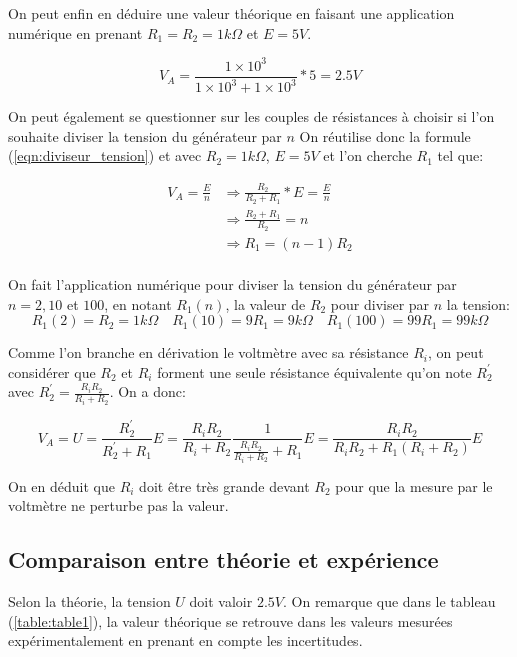 \documentclass[10pt]{article}
\begin{document}
On peut enfin en déduire une valeur théorique en faisant une application numérique en prenant $R_1 = R_2 = 1 k\Omega$ et $E = 5V$.

\begin{equation}
    V_A = \frac{1 \times 10^3}{1 \times 10^3 + 1 \times 10^3} * 5 = 2.5V
\end{equation}

On peut également se questionner sur les couples de résistances à choisir si l'on souhaite diviser la tension du générateur par $n$
On réutilise donc la formule (\ref{eqn:diviseur_tension}) et avec $R_2 = 1k\Omega$, $E = 5V$ et l'on cherche $R_1$ tel que:

\begin{equation}
    \begin{split}
        V_A = \frac{E}{n} & \Rightarrow \frac{R_2}{R_2 + R_1} * E = \frac{E}{n} \\
        & \Rightarrow \frac{R_2 + R_1}{R_2} = n \\
        & \Rightarrow R_1 = (n-1)R_2 \\
    \end{split}
\end{equation}

On fait l'application numérique pour diviser la tension du générateur par $n = 2, 10$ et $100$, en notant $R_1(n)$, la valeur de $R_2$
pour diviser par $n$ la tension:
\begin{equation}
    R_1(2) = R_2 = 1k \Omega \quad R_1(10) = 9R_1 = 9k \Omega \quad R_1(100) = 99 R_1 = 99 k\Omega
\end{equation}

Comme l'on branche en dérivation le voltmètre avec sa résistance $R_i$, on peut considérer que $R_2$ et $R_i$ forment une seule résistance équivalente
qu'on note $R_2^{'}$ avec $R_2^{'} = \frac{R_iR_2}{R_i + R_2}$. On a donc: 

\begin{equation}
    V_A = U = \frac{R_2^{'}}{R_2^{'} + R_1} E = \frac{R_iR_2}{R_i + R_2} \frac{1}{\frac{R_iR_2}{R_i + R_2} + R_1} E = \frac{R_iR_2}{R_iR_2 + R_1(R_i + R_2)} E 
\end{equation}

On en déduit que $R_i$ doit être très grande devant $R_2$ pour que la mesure par le voltmètre ne perturbe pas la valeur.

\subsection{Comparaison entre théorie et expérience}
Selon la théorie, la tension $U$ doit valoir $2.5V$. On remarque que dans le tableau (\ref{table:table1}), la valeur théorique se retrouve
dans les valeurs mesurées expérimentalement en prenant en compte les incertitudes.
\end{document}
